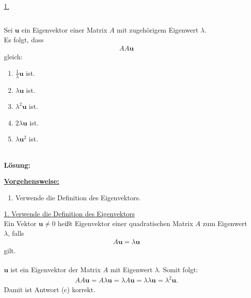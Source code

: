 \underline{1. }\\

\newpage

\subsection*{}
Sei $\mathbf{u} $ ein Eigenvektor einer Matrix $A$ mit zugehörigem Eigenwert $\lambda$.
\\
Es folgt, dass 
\begin{align*}
	AA \mathbf{u}
\end{align*}
gleich:
\renewcommand{\labelenumi}{(\alph{enumi})}
\begin{enumerate}
	\item 
	$ \frac{1}{\lambda} \mathbf{u} $ ist.
	\item 
	$ \lambda \mathbf{u} $ ist.
	\item
	$ \lambda^2 \mathbf{u}$ ist.
	\item
	$ 2\lambda \mathbf{u} $ ist.
	\item 
	$ \lambda \mathbf{u}^2 $ ist.
\end{enumerate}
\ \\
\textbf{Lösung:}
\begin{mdframed}
\underline{\textbf{Vorgehensweise:}}
\renewcommand{\labelenumi}{\theenumi.}
\begin{enumerate}
\item Verwende die Definition des Eigenvektors.
\end{enumerate}
\end{mdframed}

\underline{1. Verwende die Definition des Eigenvektors}\\
Ein Vektor $\mathbf{u} \neq 0$ heißt Eigenvektor einer quadratischen Matrix $A$ zum Eigenwert $\lambda$, falls
\begin{align*}
	A \mathbf{u} = \lambda \mathbf{u}
\end{align*}
gilt.\\
\\
$\mathbf{u}$ ist ein Eigenvektor der Matrix $A$ mit Eigenwert $\lambda $.
Somit folgt:
\begin{align*}
	A A \mathbf{u} 
	=
	A \lambda \mathbf{u} 
	= 
	\lambda A \mathbf{u} 
	= 
	\lambda \lambda \mathbf{u}
	= 
	\lambda^2 \mathbf{u}.
\end{align*}
Damit ist Antwort (c) korrekt.



\newpage
